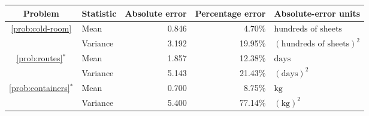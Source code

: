 \begin{center}\begin{tabular}{clrrl}
\toprule Problem&Statistic&Absolute error&Percentage error&Absolute-error units\\\midrule

\ref{prob:cold-room}&Mean&0.846&4.70\%&$\text{hundreds of sheets}$\\

&Variance&3.192&19.95\%&$(\text{hundreds of sheets})^2$\\

\ref{prob:routes}$^*$&Mean&1.857&12.38\%&$\mathrm{days}$\\

&Variance&5.143&21.43\%&$(\mathrm{days})^2$\\

\ref{prob:containers}$^*$&Mean&0.700&8.75\%&$\mathrm{kg}$\\

&Variance&5.400&77.14\%&$(\mathrm{kg})^2$\\

\bottomrule\end{tabular}\end{center}
